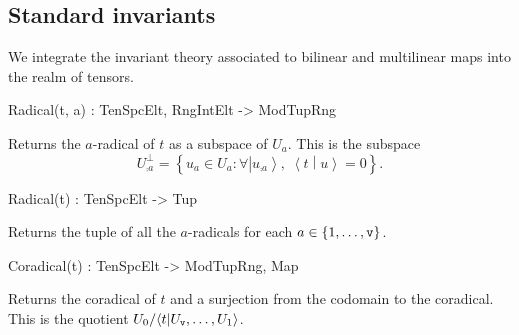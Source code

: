 
\subsection{Standard invariants}

We integrate the invariant theory associated to bilinear and multilinear maps
into the realm of tensors. 

\begin{intrinsics}
Radical(t, a) : TenSpcElt, RngIntElt -> ModTupRng
\end{intrinsics}

Returns the $a$-radical of $t$ as a subspace of $U_a$. 
This is the subspace 
\[ U_{\comp{a}}^\perp = \left\{ u_a \in U_a : \forall \left| u_{\comp{a}}\right\rangle,\; \left\langle t \middle| u\right\rangle =0\right\}. \] 

\begin{intrinsics}
Radical(t) : TenSpcElt -> Tup
\end{intrinsics}

Returns the tuple of all the $a$-radicals for each $a\in \{1,\dots,\operatorname{\mathtt{v}}\}$.

\begin{intrinsics}
Coradical(t) : TenSpcElt -> ModTupRng, Map
\end{intrinsics}

Returns the coradical of $t$ and a surjection from the codomain to the coradical.
This is the quotient $U_0 / \langle t | U_{\operatorname{\mathtt{v}}}, \dots, U_1\rangle$.

